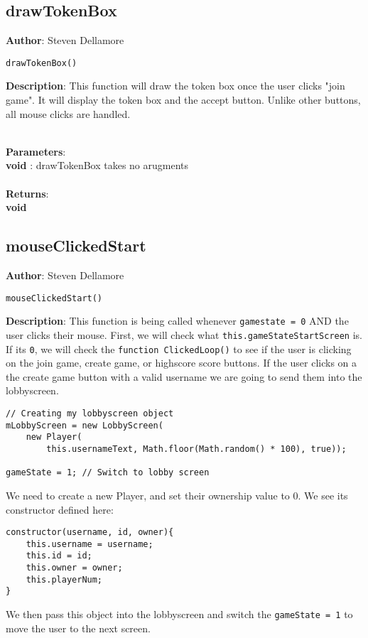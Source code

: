 \documentclass[12pt]{article}
\begin{document}
\subsection{drawTokenBox}
\textbf{Author}: Steven Dellamore 
\vspace*{1\baselineskip}
\begin{lstlisting}
drawTokenBox()
\end{lstlisting} 
\vspace*{1\baselineskip}
\textbf{Description}: This function will draw the token box once the user clicks "join game". It will display the token box and the accept button. Unlike other buttons, all mouse clicks are handled. 


\textbf{\large{\\Parameters}}:\\
\textbf{void }: drawTokenBox takes no arugments\\\textbf{\large{\\Returns}}:\\
\textbf{void}

\subsection{mouseClickedStart}
\textbf{Author}: Steven Dellamore 
\vspace*{1\baselineskip}
\begin{lstlisting}
mouseClickedStart()
\end{lstlisting} 
\vspace*{1\baselineskip}
\textbf{Description}: This function is being called whenever \texttt{gamestate = 0} AND the user clicks their mouse. First, we will check what \texttt{this.gameStateStartScreen} is. If its \texttt{0}, we will check the \texttt{function ClickedLoop()} to see if the user is clicking on the join game, create game, or highscore score buttons. If the user clicks on a the create game button with a valid username we are going to send them into the lobbyscreen. 
\begin{verbatim}
// Creating my lobbyscreen object
mLobbyScreen = new LobbyScreen(
	new Player(
		this.usernameText, Math.floor(Math.random() * 100), true));

gameState = 1; // Switch to lobby screen
\end{verbatim}
 We need to create a new Player, and set their ownership value to 0. We see its constructor defined here: 
\begin{verbatim}
constructor(username, id, owner){
    this.username = username;
    this.id = id;
    this.owner = owner;
    this.playerNum;
}
\end{verbatim}
 We then pass this object into the lobbyscreen and switch the \texttt{gameState = 1} to move the user to the next screen. 
\end{document}
